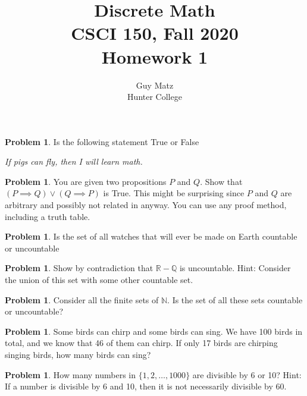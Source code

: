 \documentclass[10pt,leqno ]{article}
\title{Discrete Math\\
CSCI 150, Fall 2020\\
Homework 1}
\author{Guy Matz \\
Hunter College}
\theoremstyle{definition}
\newtheorem{problem}[theorem]{Problem}
\begin{document}
\begin{problem}  Is the following statement True or False
\begin{center}
\textit{If pigs can fly, then I will learn math.}
\end{center}
\Large

\end{problem}
\newpage

\begin{problem} You are given two propositions $P$ and $Q$.  Show that $(P \implies Q) \vee (Q \implies P)$ is True.  This might be surprising since $P$ and $Q$ are arbitrary and possibly not related in anyway.  You can use any proof method, including a truth table.
\\
\Large
\end{problem}
\newpage

\begin{problem} Is  the  set  of  all  watches  that  will  ever  be  made  on  Earth  countable  or uncountable
\\
\Large
\end{problem}
\newpage

\begin{problem} Show  by  contradiction  that $\mathbb{R} - \mathbb{Q}$ is  uncountable.  Hint: Consider the union of this set with some other countable set.
\\
\Large
\end{problem}
\newpage

\begin{problem} Consider all the finite sets of $\mathbb{N}$.  Is the set of all these sets countable or uncountable?
\\
\Large
\end{problem}
\newpage

\begin{problem} Some birds can chirp and some birds can sing.  We have 100 birds in total, and  we  know  that  46  of  them  can  chirp.   If  only  17  birds  are  chirping singing birds, how many birds can sing?
\\
\Large
\end{problem}
\newpage

\begin{problem} How many numbers in $\{1,2, \dots ,1000\}$ are divisible by 6 or 10?  Hint:  If a number is divisible by 6 and 10, then it is not necessarily divisible by 60.
\\
\Large
\end{problem}
\newpage
\end{document}

